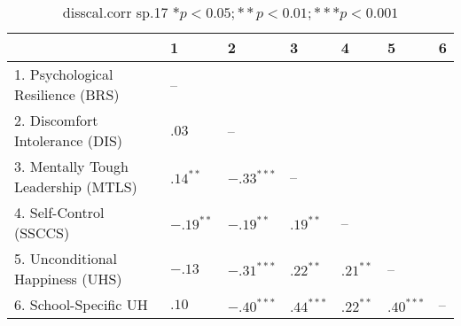 \begin{table}[ht]
\centering
\begin{tabular}{lllllll}
  \hline
 & 1 & 2 & 3 & 4 & 5 & 6 \\ 
  \hline
1. Psychological Resilience (BRS) & -- &  &  &  &  &  \\ 
  2. Discomfort Intolerance (DIS) & $.03$ & -- &  &  &  &  \\ 
  3. Mentally Tough Leadership (MTLS) & $.14^{**}$ & $-.33^{***}$ & -- &  &  &  \\ 
  4. Self-Control (SSCCS) & $-.19^{**}$ & $-.19^{**}$ & $.19^{**}$ & -- &  &  \\ 
  5. Unconditional Happiness (UHS) & $-.13$ & $-.31^{***}$ & $.22^{**}$ & $.21^{**}$ & -- &  \\ 
  6. School-Specific UH & $.10$ & $-.40^{***}$ & $.44^{***}$ & $.22^{**}$ & $.40^{***}$ & -- \\ 
   \hline
\end{tabular}
\caption{disscal.corr sp.17 $* p < 0.05; ** p < 0.01; *** p < 0.001$} 
\label{freq_corr.disscal.corr.sp.17}
\end{table}
